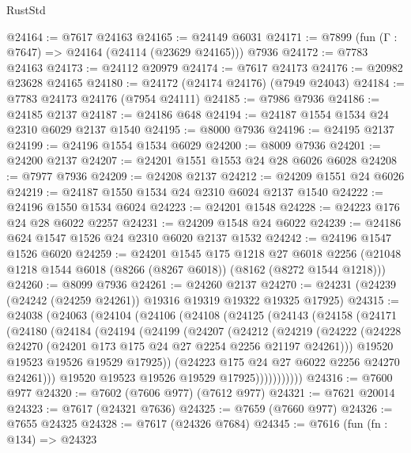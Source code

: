 \begin{lexlean}{RustStd}
\begin{coremodule}
@24164 := @7617 @24163
@24165 := @24149 @6031
@24171 := @7899 (fun (Γ : @7647) => @24164 (@24114 (@23629 @24165))) @7936
@24172 := @7783 @24163
@24173 := @24112 @20979
@24174 := @7617 @24173
@24176 := @20982 @23628 @24165
@24180 := @24172 (@24174 @24176) (@7949 @24043)
@24184 := @7783 @24173 @24176 (@7954 @24111)
@24185 := @7986 @7936
@24186 := @24185 @2137
@24187 := @24186 @648
@24194 := @24187 @1554 @1534 @24 @2310 @6029 @2137 @1540
@24195 := @8000 @7936
@24196 := @24195 @2137
@24199 := @24196 @1554 @1534 @6029
@24200 := @8009 @7936
@24201 := @24200 @2137
@24207 := @24201 @1551 @1553 @24 @28 @6026 @6028
@24208 := @7977 @7936
@24209 := @24208 @2137
@24212 := @24209 @1551 @24 @6026
@24219 := @24187 @1550 @1534 @24 @2310 @6024 @2137 @1540
@24222 := @24196 @1550 @1534 @6024
@24223 := @24201 @1548
@24228 := @24223 @176 @24 @28 @6022 @2257
@24231 := @24209 @1548 @24 @6022
@24239 := @24186 @624 @1547 @1526 @24 @2310 @6020 @2137 @1532
@24242 := @24196 @1547 @1526 @6020
@24259 := @24201
    @1545
    @175
    @1218
    @27
    @6018
    @2256
    (@21048 @1218 @1544 @6018 (@8266 (@8267 @6018)) (@8162 (@8272 @1544 @1218)))
@24260 := @8099 @7936
@24261 := @24260 @2137
@24270 := @24231 (@24239 (@24242 (@24259 @24261)) @19316 @19319 @19322 @19325 @17925)
@24315 := @24038
    (@24063
      (@24104
        (@24106
          (@24108
            (@24125
              (@24143
                (@24158
                  (@24171
                    (@24180
                      (@24184
                        (@24194
                          (@24199
                            (@24207
                              (@24212
                                (@24219
                                  (@24222
                                    (@24228
                                      @24270
                                      (@24201 @173 @175 @24 @27 @2254 @2256 @21197 @24261)))
                                  @19520
                                  @19523
                                  @19526
                                  @19529
                                  @17925))
                              (@24223 @175 @24 @27 @6022 @2256 @24270 @24261)))
                          @19520
                          @19523
                          @19526
                          @19529
                          @17925)))))))))))
@24316 := @7600 @977
@24320 := @7602 (@7606 @977) (@7612 @977)
@24321 := @7621 @20014
@24323 := @7617 (@24321 @7636)
@24325 := @7659 (@7660 @977)
@24326 := @7655 @24325
@24328 := @7617 (@24326 @7684)
@24345 := @7616
    (fun (fn : @134) =>
    @24323

\end{coremodule}
\end{lexlean}

